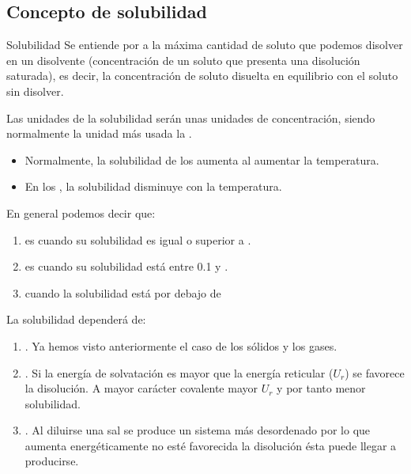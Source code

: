     \subsection{Concepto de solubilidad}\label{subsec:concepto-de-solubilidad}

    \begin{center}
        \begin{definicion}[width=0.9\textwidth]{Solubilidad}
            Se entiende por  a la máxima cantidad de soluto que podemos disolver en un disolvente (concentración de un soluto que presenta una disolución saturada), es decir, la concentración de soluto disuelta en equilibrio con el soluto sin disolver.

            Las unidades de la solubilidad serán unas unidades de concentración, siendo normalmente la unidad más usada la \si{{\M}}.
        \end{definicion}
    \end{center}


    \begin{itemize}
        \item Normalmente, la solubilidad de los  aumenta al aumentar la temperatura.
        \item En los , la solubilidad disminuye con la temperatura.
    \end{itemize}

    En general podemos decir que:
    \begin{enumerate}[label=\numberballmDarkTeal]
        \item {} es cuando su solubilidad es igual o superior a .
        \item {} es cuando su solubilidad está entre \num{0.1} y .
        \item {} cuando la solubilidad está por debajo de 
    \end{enumerate}
    La solubilidad dependerá de:
    \begin{enumerate}[label=\numberballmDarkTeal]
        \item {}.
        Ya hemos visto anteriormente el caso de los sólidos y los gases.
        \item {}.
        Si la energía de solvatación es mayor que la energía reticular (\(U_r\)) se favorece la disolución.
        A mayor carácter covalente mayor \(U_r\) y por tanto menor solubilidad.
        \item {}.
        Al diluirse una sal se produce un sistema más desordenado por lo que aumenta energéticamente no esté favorecida la disolución ésta puede llegar a producirse.
    \end{enumerate}

